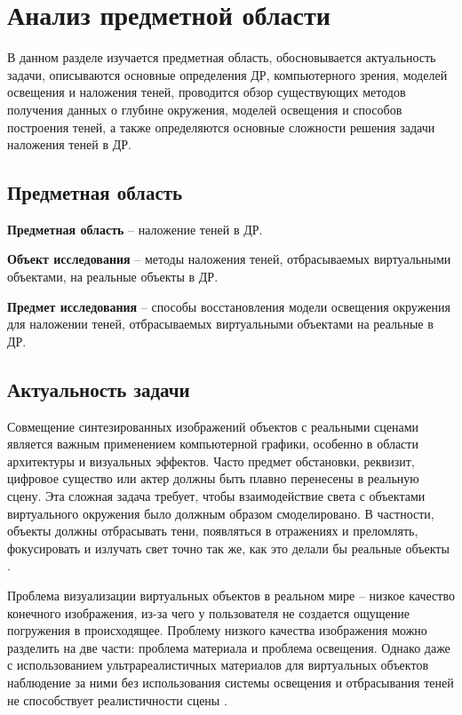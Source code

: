 \chapter{Анализ предметной области}

В данном разделе изучается предметная область, обосновывается актуальность задачи, описываются основные определения ДР, компьютерного зрения, моделей освещения и наложения теней, проводится обзор существующих методов получения данных о глубине окружения, моделей освещения и способов построения теней, а также определяются основные сложности решения задачи наложения теней в ДР.

\section{Предметная область}

\textbf{Предметная область} -- наложение теней в ДР.

\textbf{Объект исследования} -- методы наложения теней, отбрасываемых виртуальными объектами, на реальные объекты в ДР.

\textbf{Предмет исследования} -- способы восстановления модели освещения окружения для наложении теней, отбрасываемых виртуальными объектами на реальные в ДР.

\section{Актуальность задачи}

Совмещение синтезированных изображений объектов с реальными сценами является важным применением компьютерной графики, особенно в области архитектуры и визуальных эффектов. Часто предмет обстановки, реквизит, цифровое существо или актер должны быть плавно перенесены в реальную сцену. Эта сложная задача требует, чтобы взаимодействие света с объектами виртуального окружения было должным образом смоделировано. В частности, объекты должны отбрасывать тени, появляться в отражениях и преломлять, фокусировать и излучать свет точно так же, как это делали бы реальные объекты \cite{debevec2008rendering}.

Проблема визуализации виртуальных объектов в реальном мире -- низкое качество конечного изображения, из-за чего у пользователя не создается ощущение погружения в происходящее. Проблему низкого качества изображения можно разделить на две части: проблема материала и проблема освещения. Однако даже с использованием ультрареалистичных материалов для виртуальных объектов наблюдение за ними без использования системы освещения и отбрасывания теней не способствует реалистичности сцены \cite{osti2019real}.


